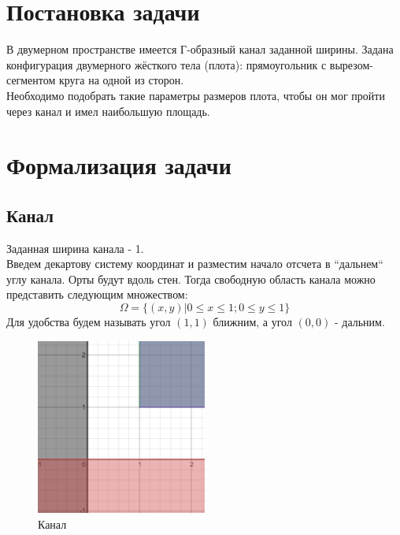 
\usepackage{amsmath}




\renewcommand\contentsname{\centerline{Содержание}}
\tableofcontents
\newpage


\section{Постановка задачи}
В двумерном пространстве имеется Г-образный канал заданной ширины. Задана конфигурация двумерного жёсткого тела (плота): прямоугольник с вырезом-сегментом круга на одной из сторон. \\
Необходимо подобрать такие параметры размеров плота, чтобы он мог пройти через канал и имел наибольшую площадь.


\section{Формализация задачи}
\subsection{Канал}
Заданная ширина канала - 1. \\

Введем декартову систему координат и разместим начало отсчета в ``дальнем`` углу канала. Орты будут вдоль стен. Тогда свободную область канала можно представить следующим множеством:\\
\begin{equation}
\Omega=\{(x,y) | 0\leq x \leq 1 ; 0\leq y \leq 1\}
\end{equation}
Для удобства будем называть угол $(1,1)$ ближним, а угол $(0,0)$ - дальним.

\begin{figure}[!htb]
    \centering
    \includegraphics[width=0.5\textwidth]{fig/corridor.png}
    \caption{Канал}
\end{figure}


